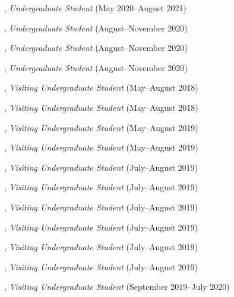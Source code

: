 \documentclass[10pt]{article}
\newenvironment{myindentpar}[1]%
{\begin{list}{}%
         {\setlength{\leftmargin}{#1}}%
         \item[]%
}
{\end{list}}
\newcounter{list}
\begin{document}
\begin{myindentpar}{0.75cm}
\hspace{-0.75cm}{\bf Ann Hermann}, \textit{Undergraduate Student} (May 2020--August 2021)

\hspace{-0.75cm}{\bf Joseph Kuebler}, \textit{Undergraduate Student} (August--November 2020)

\hspace{-0.75cm}{\bf Facundo Munoz}, \textit{Undergraduate Student} (August--November 2020)

\hspace{-0.75cm}{\bf Fangcong Yin}, \textit{Undergraduate Student} (August--November 2020)

\hspace{-0.75cm}{\bf Wenhao Yu}, \textit{Visiting Undergraduate Student} (May--August 2018)

\hspace{-0.75cm}{\bf Yu Shu}, \textit{Visiting Undergraduate Student} (May--August 2018)

\hspace{-0.75cm}{\bf Chuchen Deng}, \textit{Visiting Undergraduate Student} (May--August 2019)

\hspace{-0.75cm}{\bf Yihong Ma}, \textit{Visiting Undergraduate Student} (May--August 2019)

\hspace{-0.75cm}{\bf Xin Liu}, \textit{Visiting Undergraduate Student} (July--August 2019)

\hspace{-0.75cm}{\bf Wei Peng}, \textit{Visiting Undergraduate Student} (July--August 2019)

\hspace{-0.75cm}{\bf Mengxia Yu}, \textit{Visiting Undergraduate Student} (July--August 2019)

\hspace{-0.75cm}{\bf Kaifeng Yu}, \textit{Visiting Undergraduate Student} (July--August 2019)

\hspace{-0.75cm}{\bf Zhihan Zhang}, \textit{Visiting Undergraduate Student} (July--August 2019)

\hspace{-0.75cm}{\bf Yang Zhou}, \textit{Visiting Undergraduate Student} (July--August 2019)

\hspace{-0.75cm}{\bf Zaitang Li}, \textit{Visiting Undergraduate Student} (September 2019--July 2020)


\end{myindentpar}
\end{document}
